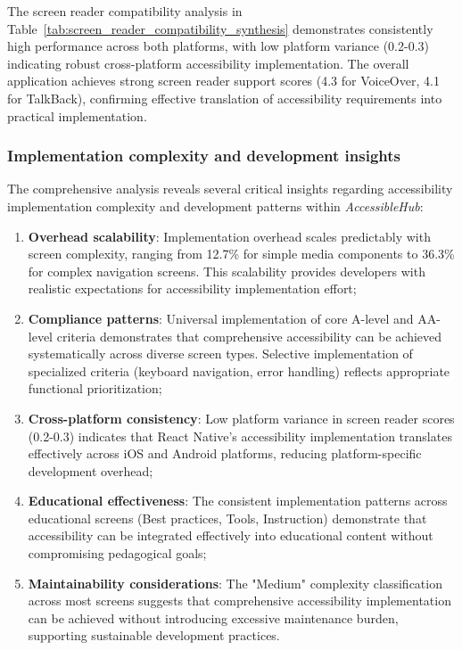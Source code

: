 \FloatBarrier

The screen reader compatibility analysis in Table~\ref{tab:screen_reader_compatibility_synthesis} demonstrates consistently high performance across both platforms, with low platform variance (0.2-0.3) indicating robust cross-platform accessibility implementation. The overall application achieves strong screen reader support scores (4.3 for VoiceOver, 4.1 for TalkBack), confirming effective translation of accessibility requirements into practical implementation.

\subsubsection{Implementation complexity and development insights}
\label{subsubsec:implementation-complexity-insights}

The comprehensive analysis reveals several critical insights regarding accessibility implementation complexity and development patterns within \textit{AccessibleHub}:

\begin{enumerate}
    \item \textbf{Overhead scalability}: Implementation overhead scales predictably with screen complexity, ranging from 12.7\% for simple media components to 36.3\% for complex navigation screens. This scalability provides developers with realistic expectations for accessibility implementation effort;
    
    \item \textbf{Compliance patterns}: Universal implementation of core A-level and AA-level criteria demonstrates that comprehensive accessibility can be achieved systematically across diverse screen types. Selective implementation of specialized criteria (keyboard navigation, error handling) reflects appropriate functional prioritization;
    
    \item \textbf{Cross-platform consistency}: Low platform variance in screen reader scores (0.2-0.3) indicates that React Native's accessibility implementation translates effectively across iOS and Android platforms, reducing platform-specific development overhead;
    
    \item \textbf{Educational effectiveness}: The consistent implementation patterns across educational screens (Best practices, Tools, Instruction) demonstrate that accessibility can be integrated effectively into educational content without compromising pedagogical goals;
    
    \item \textbf{Maintainability considerations}: The "Medium" complexity classification across most screens suggests that comprehensive accessibility implementation can be achieved without introducing excessive maintenance burden, supporting sustainable development practices.
\end{enumerate}

